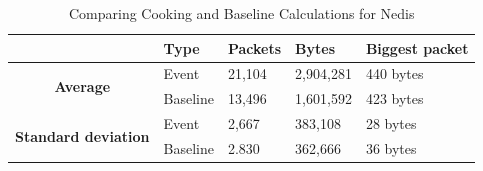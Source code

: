 \begin{table}[H]
    \centering
    \caption{Comparing Cooking and Baseline Calculations for Nedis}
    \begin{tabular}{c|l|l|l|l|}
        \cline{2-5}
        \multicolumn{1}{l|}{}                                              & \textbf{Type} & \textbf{Packets} & \textbf{Bytes} & \textbf{Biggest packet} \\ \hline
        \multicolumn{1}{|c|}{\multirow{2}{*}{\textbf{Average}}}            & Event         & 21,104              & 2,904,281        & 440 bytes               \\ \cline{2-5} 
        \multicolumn{1}{|c|}{}                                             & Baseline      & 13,496              & 1,601,592         & 423 bytes                \\ \hline
        \multicolumn{1}{|c|}{\multirow{2}{*}{\textbf{Standard deviation}}} & Event         & 2,667              & 383,108         & 28 bytes                 \\ \cline{2-5} 
        \multicolumn{1}{|c|}{}                                             & Baseline      & 2.830               & 362,666        &  36 bytes               \\ \hline          
    \end{tabular}
    \label{tab:NedisComparingBaselineAndCookingCalculations}
\end{table}

